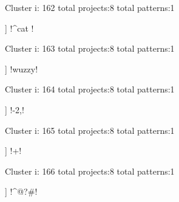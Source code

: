 Cluster i: 162
total projects:8
total patterns:1
\begin{multicols}{1}
\begin{description}[noitemsep,topsep=0pt]
\item [[8] ] \cverb!^cat !
\end{description}
\end{multicols}







Cluster i: 163
total projects:8
total patterns:1
\begin{multicols}{1}
\begin{description}[noitemsep,topsep=0pt]
\item [[8] ] \cverb!wuzzy!
\end{description}
\end{multicols}







Cluster i: 164
total projects:8
total patterns:1
\begin{multicols}{1}
\begin{description}[noitemsep,topsep=0pt]
\item [[8] ] \cverb!-{2,}!
\end{description}
\end{multicols}







Cluster i: 165
total projects:8
total patterns:1
\begin{multicols}{1}
\begin{description}[noitemsep,topsep=0pt]
\item [[8] ] \cverb!\n\s+!
\end{description}
\end{multicols}







Cluster i: 166
total projects:8
total patterns:1
\begin{multicols}{1}
\begin{description}[noitemsep,topsep=0pt]
\item [[8] ] \cverb!^\s*@?#!
\end{description}
\end{multicols}







